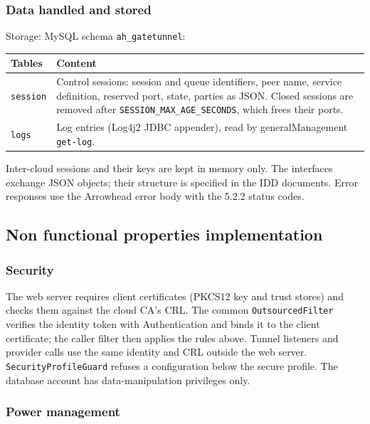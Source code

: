 \documentclass[a4paper]{arrowhead}
\begin{document}
\subsubsection{Data handled and stored}

Storage: MySQL schema \texttt{ah\_\allowbreak{}gatetunnel}:

\noindent\begin{longtable}{| p{6.4cm} | p{8.8cm} |} \hline
\rowcolor{gray!33} Tables & Content \\ \hline \endhead
\texttt{session} & Control sessions: session and queue identifiers, peer name, service definition, reserved port, state, parties as JSON. Closed sessions are removed after \texttt{SESSION\_\allowbreak{}MAX\_\allowbreak{}AGE\_\allowbreak{}SECONDS}, which frees their ports. \\ \hline
\texttt{logs} & Log entries (Log4j2 JDBC appender), read by generalManagement \texttt{get-log}. \\ \hline
\end{longtable}

Inter-cloud sessions and their keys are kept in memory only. The interfaces exchange JSON objects; their structure is specified in the IDD documents. Error responses use the Arrowhead error body with the 5.2.2 status codes.

\subsection{Non functional properties implementation}

\subsubsection{Security}

The web server requires client certificates (PKCS12 key and trust stores) and checks them against the cloud CA's CRL. The common \texttt{OutsourcedFilter} verifies the identity token with Authentication and binds it to the client certificate; the caller filter then applies the rules above. Tunnel listeners and provider calls use the same identity and CRL outside the web server. \texttt{SecurityProfileGuard} refuses a configuration below the secure profile. The database account has data-manipulation privileges only.

\subsubsection{Power management}
\end{document}
